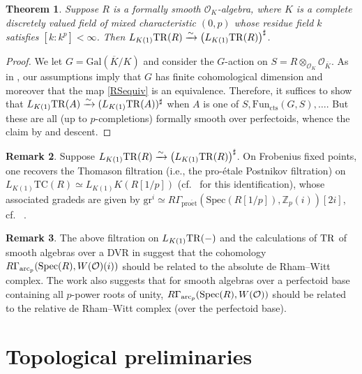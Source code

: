 \documentclass{amsart}
\newcommand{\proet}{\mathrm{pro\acute{e}t}}
\newcommand{\gr}{\mathrm{gr}}
\newtheorem{theorem}{Theorem}[section]
\theoremstyle{definition}
\newcommand{\spec}{\mathrm{Spec}}
\newtheorem{remark}[theorem]{Remark}
\newcommand{\TC}{\mathrm{TC}}
\begin{document}
\begin{theorem} 
Suppose $R$ is a formally smooth $\mathcal{O}_K$-algebra, where $K$ is a complete
discretely valued field
of mixed 
characteristic $(0, p)$
whose residue field $k$ satisfies $[k:k^p]< \infty$. Then 
$L_{K(1)} \mathrm{TR}(R) \xrightarrow{\sim} 
\left( L_{K(1)} \mathrm{TR}(R) \right)^{\sharp}$. 
\end{theorem} 
\begin{proof} 
We 
let $G = \mathrm{Gal}(\overline{K}/K)$ and consider the $G$-action on 
$S = R \otimes_{\mathcal{O}_K} \mathcal{O}_{\overline{K}}$. 
As in , our assumptions imply that $G$ has finite cohomological dimension and moreover
that the map 
\eqref{RSequiv} is an equivalence. 
Therefore, it suffices to show that 
$L_{K(1)} \mathrm{TR}( A) \xrightarrow{\sim} (L_{K(1)} \mathrm{TR}( A))^{\sharp} $
when $A$ is one of 
$S, \mathrm{Fun}_{\mathrm{cts}}(G, S), \dots$. 
But these are all (up to $p$-completions) formally
smooth over perfectoids,  
whence the claim by 
 and descent. 
\end{proof} 



\begin{remark} 
Suppose $L_{K(1)} \mathrm{TR}(R) \xrightarrow{\sim} \left(L_{K(1)} \mathrm{TR}(R)
\right)^{\sharp}$. 
On Frobenius fixed points, one recovers the Thomason \cite{Tho85,
TT90} filtration (i.e., the pro-\'etale Postnikov filtration) on 
$L_{K(1)} \TC(R) \simeq L_{K(1)} K(R[1/p])$ (cf.~\cite{BCM} for this
identification), whose associated gradeds are given
by 
$\gr^i \simeq R \Gamma_{\proet}( \spec(R[1/p]), \mathbb{Z}_p(i))[2i]$, cf.~
. 
\end{remark} 


\begin{remark} 
The above filtration on $L_{K(1)} \mathrm{TR}(-)$ 
and the calculations of $\mathrm{TR}$ of smooth algebras over a DVR in 
\cite{HM03, HM04, GH06}
suggest that the cohomology 
$R \Gamma_{\arc}( \spec(R), W(\mathcal{O})(i))$ should be related to 
the absolute de Rham--Witt 
complex. 
The work \cite{Mor18} also suggests that for smooth algebras over a perfectoid
base containing all $p$-power roots of unity, 
$R \Gamma_{\arc}( \spec(R), W(\mathcal{O}))$ should be related to the relative de
Rham--Witt complex (over the perfectoid base). 
\end{remark} 

\appendix

\section{Topological preliminaries}
\end{document}
